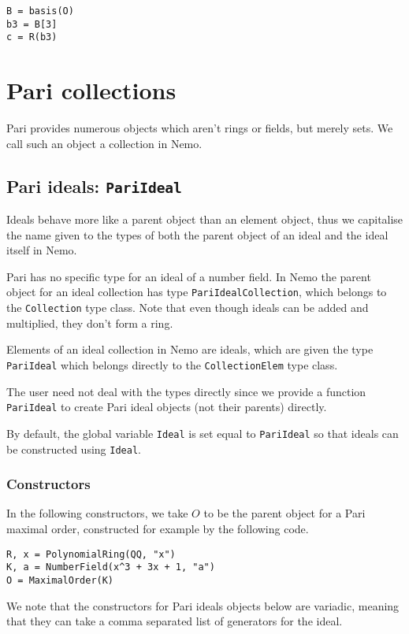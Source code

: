 \documentclass[a4paper,10pt]{article}
\newcommand{\code}{\lstinline}
\begin{document}
{{\begin{lstlisting}
B = basis(O)
b3 = B[3]
c = R(b3)
\end{lstlisting}

\section{Pari collections}

Pari provides numerous objects which aren't rings or fields, but merely sets.
We call such an object a collection in Nemo.

\subsection{Pari ideals: \code|PariIdeal|}

Ideals behave more like a parent object than an element object, thus we capitalise
the name given to the types of both the parent object of an ideal and the ideal
itself in Nemo.

Pari has no specific type for an ideal of a number field. In Nemo the parent
object for an ideal collection has type \code{PariIdealCollection}, which belongs
to the \code{Collection} type class. Note that even though ideals can be added
and multiplied, they don't form a ring.

Elements of an ideal collection in Nemo are ideals, which are given the type
\code{PariIdeal} which belongs directly to the \code{CollectionElem} type class.

The user need not deal with the types directly since we provide a function
\code{PariIdeal} to create Pari ideal objects (not their parents) directly.

By default, the global variable \code{Ideal} is set equal to
\code{PariIdeal} so that ideals can be constructed using \code{Ideal}.

\subsubsection{Constructors}

In the following constructors, we take $O$ to be the parent object for a Pari
maximal order, constructed for example by the following code.

\begin{lstlisting}
R, x = PolynomialRing(QQ, "x")
K, a = NumberField(x^3 + 3x + 1, "a")
O = MaximalOrder(K)
\end{lstlisting}

We note that the constructors for Pari ideals objects below are variadic,
meaning that they can take a comma separated list of generators for the ideal.

}}
\end{document}
